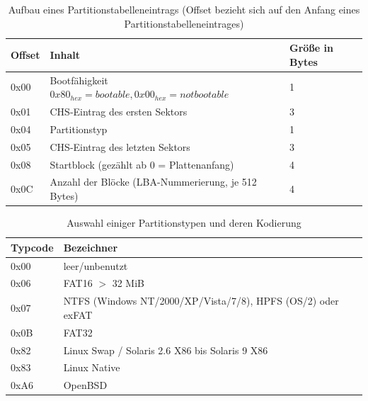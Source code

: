 \documentclass[11pt,a4paper]{article}
\begin{document}
\begin{table}[h]
	\begin{center}
		\begin{tabular}[c]{ | l | l | l |}
		\hline
		\cellcolor{grey} Offset & \cellcolor{grey} Inhalt & \cellcolor{grey} Größe in Bytes \\ \hline
		0x00 & Bootfähigkeit \(0x80_{hex}=bootable, 0x00_{hex}=not bootable\) & 1\\ \hline
		0x01 & CHS-Eintrag des ersten Sektors & 3 \\ \hline
		0x04 & Partitionstyp & 1 \\ \hline
		0x05 & CHS-Eintrag des letzten Sektors & 3 \\ \hline
		0x08 & Startblock (gezählt ab 0 = Plattenanfang) & 4 \\ \hline
		0x0C & Anzahl der Blöcke (LBA-Nummerierung, je 512 Bytes) & 4\\ \hline
		\end{tabular}
	\end{center}
	
	\caption{Aufbau eines Partitionstabelleneintrags (Offset bezieht sich auf den Anfang eines Partitionstabelleneintrages)}
	\label{tab:mbr_partentry_tbl}
\end{table}

\pagebreak{}

\begin{table}[h]
	\begin{center}
		\begin{tabular}[c]{ | l | l |}
		\hline
		\cellcolor{grey} Typcode & \cellcolor{grey} Bezeichner \\ \hline
		0x00 & leer/unbenutzt \\ \hline
		0x06 & FAT16 \(>\) 32 MiB \\ \hline
		0x07 & NTFS (Windows NT/2000/XP/Vista/7/8), HPFS (OS/2) oder exFAT \\ \hline
		0x0B & FAT32 \\ \hline
		0x82 & Linux Swap / Solaris 2.6 X86 bis Solaris 9 X86 \\ \hline
		0x83 & Linux Native \\ \hline
		0xA6 & OpenBSD \\ \hline
		\end{tabular}
	\end{center}
	
	\caption{Auswahl einiger Partitionstypen und deren Kodierung}
	\label{tab:mbr_parttype}
\end{table}
\end{document}
